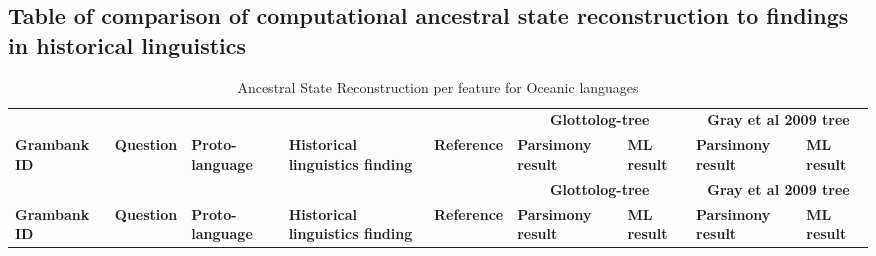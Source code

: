 \documentclass[a4paper,10pt]{article} %
\begin{document}
\subsection*{Table of comparison of computational ancestral state reconstruction to findings in historical linguistics}
\label{asr_table_appendic}
\singlespacing
\begin{landscape}
\begin{longtable}{| p{2cm}| p{3cm}| p{2.5cm}|p{2cm}|p{2cm}|p{2cm}|p{2cm}|p{2cm}|p{2cm}|}

\caption{{Ancestral State Reconstruction per feature for Oceanic languages}} \label{ASR_comparison_table} \\
\hline
& &&  &&  \multicolumn{2}{c|}{\textbf{Glottolog-tree}} &\multicolumn{2}{c|}{\textbf{Gray et al 2009 tree}}\\ \cline{6-9}
\textbf{Grambank ID}  & \textbf{Question} & \textbf{Proto-language} & \textbf{Historical linguistics finding}& \textbf{Reference} & \textbf{Parsimony result } & \textbf{ML result} & \textbf{Parsimony result } & \textbf{ML result} \\ 

\endfirsthead

\hline
& &&  &&  \multicolumn{2}{c|}{\textbf{Glottolog-tree}} &\multicolumn{2}{c|}{\textbf{Gray et al 2009 tree}}\\ \cline{6-9}
\textbf{Grambank ID}  & \textbf{Question} & \textbf{Proto-language} & \textbf{Historical linguistics finding}& \textbf{Reference} & \textbf{Parsimony result } & \textbf{ML result} & \textbf{Parsimony result } & \textbf{ML result} \\ 
\endhead


\end{longtable}
\end{landscape}
\end{document}
